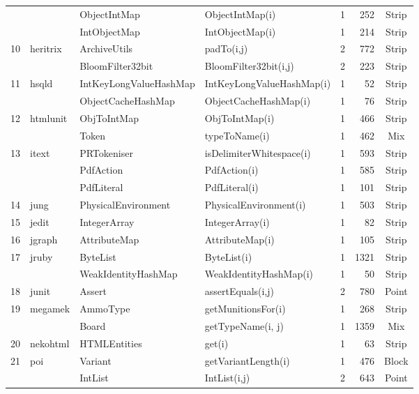 \begin{table}[H]
{{\begin{tabular}{|l|l|l|l|r|r|c|}
	&				& ObjectIntMap			& ObjectIntMap(i)			& 1			& 252	& Strip 										\\ 
	&				& IntObjectMap			& IntObjectMap(i)			& 1			& 214	& Strip 										\\ 
10	&	heritrix		& ArchiveUtils			& padTo(i,j)				& 2			& 772	& Strip  										\\ 
	&				& BloomFilter32bit 		& BloomFilter32bit(i,j)		& 2	 		& 223	& Strip  										\\ 
11	&	hsqld		& IntKeyLongValueHashMap& IntKeyLongValueHashMap(i)& 1		& 52	& Strip 										\\ 
	&				& ObjectCacheHashMap	& ObjectCacheHashMap(i)	& 1			& 76	& Strip   										\\ 
12	&	htmlunit		& ObjToIntMap			& ObjToIntMap(i)			& 1			& 466	& Strip  										\\ 
	&				& Token					& typeToName(i)			& 1			& 462	& Mix 										\\ 
13	&	itext		& PRTokeniser			& isDelimiterWhitespace(i)	& 1			& 593	& Strip  										\\ 
	&				& PdfAction				& PdfAction(i)			& 1			& 585	& Strip  										\\ 
	&				& PdfLiteral				& PdfLiteral(i)			& 1			& 101	& Strip 										\\ 
14	&	jung		& PhysicalEnvironment	& PhysicalEnvironment(i)	& 1			& 503	& Strip 										\\ 
15	&	jedit		& IntegerArray			& IntegerArray(i)			& 1			& 82	& Strip  										\\ 
16	&	jgraph		& AttributeMap			& AttributeMap(i)			& 1			& 105	& Strip										\\ 
17	&	jruby		& ByteList				& ByteList(i)				& 1			& 1321	& Strip 										\\ 
	&				& WeakIdentityHashMap	& WeakIdentityHashMap(i)	& 1			& 50	& Strip 										\\ 
18	&	junit		& Assert					& assertEquals(i,j)		& 2			& 780	& Point 										\\ 
19	&	megamek	& AmmoType			& getMunitionsFor(i)		& 1			& 268	& Strip	  									\\ 			
	&				& Board					& getTypeName(i, j)		& 1			& 1359	& Mix 										\\ 
20	&	nekohtml	& HTMLEntities			& get(i)					& 1			& 63	& Strip  										\\ 
21	&	poi			& Variant				& getVariantLength(i)		& 1			& 476	& Block  										\\ 
	&				& IntList					& IntList(i,j)				& 2			& 643	& Point 										\\ 	

\end{tabular}}}
\end{table}

